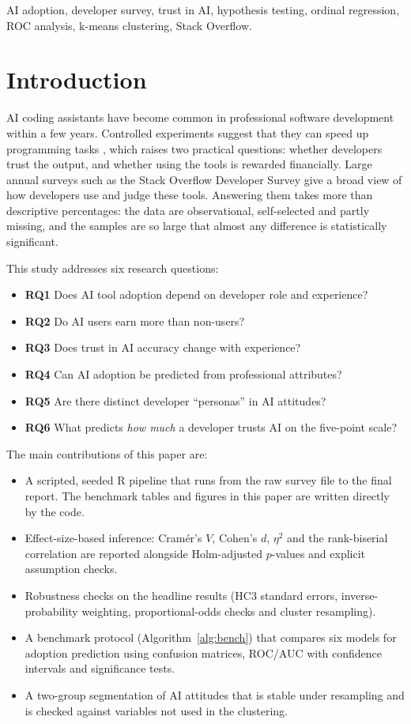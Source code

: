 \documentclass[conference]{IEEEtran}
\begin{document}
\begin{IEEEkeywords}
AI adoption, developer survey, trust in AI, hypothesis testing, ordinal regression, ROC analysis, k-means clustering, Stack Overflow.
\end{IEEEkeywords}

\section{Introduction}
AI coding assistants have become common in professional software development within a few years. Controlled experiments suggest that they can speed up programming tasks \cite{peng2023}, which raises two practical questions: whether developers trust the output, and whether using the tools is rewarded financially. Large annual surveys such as the Stack Overflow Developer Survey \cite{so2025} give a broad view of how developers use and judge these tools. Answering them takes more than descriptive percentages: the data are observational, self-selected and partly missing, and the samples are so large that almost any difference is statistically significant.

This study addresses six research questions:
\begin{itemize}
\item \textbf{RQ1} Does AI tool adoption depend on developer role and experience?
\item \textbf{RQ2} Do AI users earn more than non-users?
\item \textbf{RQ3} Does trust in AI accuracy change with experience?
\item \textbf{RQ4} Can AI adoption be predicted from professional attributes?
\item \textbf{RQ5} Are there distinct developer ``personas'' in AI attitudes?
\item \textbf{RQ6} What predicts \emph{how much} a developer trusts AI on the five-point scale?
\end{itemize}

The main contributions of this paper are:
\begin{itemize}
\item A scripted, seeded R pipeline that runs from the raw survey file to the final report. The benchmark tables and figures in this paper are written directly by the code.
\item Effect-size-based inference: Cram\'er's $V$, Cohen's $d$, $\eta^2$ and the rank-biserial correlation are reported alongside Holm-adjusted $p$-values and explicit assumption checks.
\item Robustness checks on the headline results (HC3 standard errors, inverse-probability weighting, proportional-odds checks and cluster resampling).
\item A benchmark protocol (Algorithm~\ref{alg:bench}) that compares six models for adoption prediction using confusion matrices, ROC/AUC with confidence intervals and significance tests.
\item A two-group segmentation of AI attitudes that is stable under resampling and is checked against variables not used in the clustering.
\end{itemize}
\end{document}

